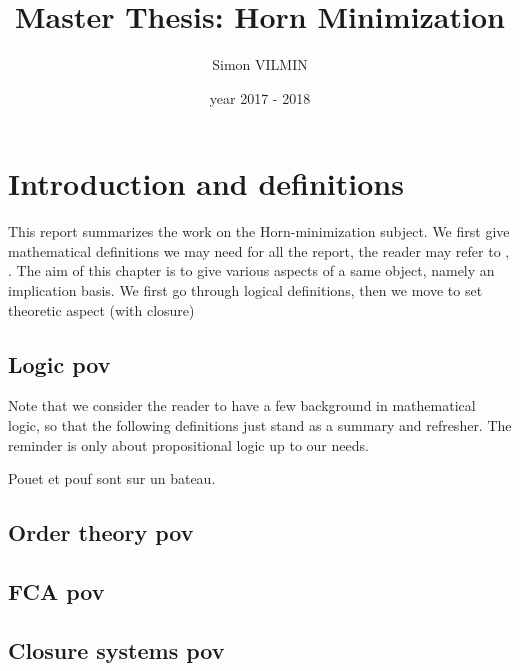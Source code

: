 \documentclass[a4paper]{report}
\title{Master Thesis: Horn Minimization}
\author{Simon VILMIN}
\date{year 2017 - 2018}
\begin{document}
\maketitle
\tableofcontents

\chapter{Introduction and definitions}

This report summarizes the work on the Horn-minimization subject. We first give
mathematical definitions we may need for all the report, the reader may refer 
to \cite{Lat&Ord}, \cite{CExp}. The aim of this chapter is to give various 
aspects of a same object, namely an implication basis. We first go through 
logical definitions, then we move to set theoretic aspect (with closure) 

\section{Logic pov}

Note that we consider the reader to have a few background in mathematical logic,
so that the following definitions just stand as a summary and refresher. The 
reminder is only about propositional logic up to our needs.

\begin{definition}
	Pouet et pouf sont sur un bateau.
\end{definition}

\begin{definition}
	
\end{definition}

\begin{definition}
	
\end{definition}

\section{Order theory pov}

\section{FCA pov}

\section{Closure systems pov}
\end{document}
